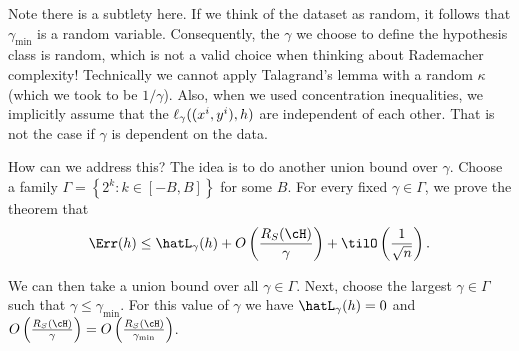 \begin{remark}
Note there is a subtlety here. If we think of the dataset as random, it follows that $\gamma_{\min}$ is a random variable. Consequently, the $\gamma$ we choose to define the hypothesis class is random, which is not a valid choice when thinking about Rademacher complexity! Technically we cannot apply Talagrand's lemma with a random $\kappa$ (which we took to be $1/\gamma$). Also, when we used concentration inequalities, we implicitly assume that the $\ell_\gamma((x\sp{i}, y\sp{i}), h)$ are independent of each other. That is not the case if $\gamma$ is dependent on the data.

How can we address this? The idea is to do another union bound over $\gamma$. Choose a family $\Gamma = \left\{ 2^k: k \in [-B, B] \right\}$ for some $B$. For every fixed $\gamma \in \Gamma$, we prove the theorem that
\begin{align}
\Err(h) \leq \hatL_\gamma (h) + O \left( \frac{R_S(\cH)}{\gamma} \right) + \tilO \left( \frac{1}{\sqrt{n}} \right).
\end{align}
\end{remark}

We can then take a union bound over all $\gamma \in \Gamma$. Next, choose the largest $\gamma \in \Gamma$ such that $\gamma \leq \gamma_{\min}$. For this value of $\gamma$ we have $\hatL_\gamma (h) = 0$ and $O \left( \frac{R_S(\cH)}{\gamma} \right) = O \left( \frac{R_S(\cH)}{\gamma_{\min}} \right)$. 